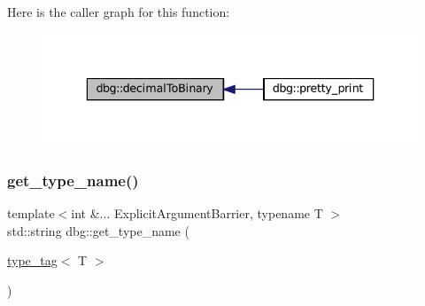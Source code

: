 Here is the caller graph for this function\+:
\nopagebreak
\begin{figure}[H]
\begin{center}
\leavevmode
\includegraphics[width=336pt]{namespacedbg_acbbd001b36aaa78716ea7d9d2aeb3e46_icgraph}
\end{center}
\end{figure}
\mbox{\label{namespacedbg_a20edc7ca4e92e4b3bddc6b983384aa00}} 
\subsubsection{\texorpdfstring{get\+\_\+type\+\_\+name()}{get\_type\_name()}\hspace{0.1cm}{\footnotesize\ttfamily [1/10]}}
{\footnotesize\ttfamily template$<$int \&... Explicit\+Argument\+Barrier, typename T $>$ \\
std\+::string dbg\+::get\+\_\+type\+\_\+name (\begin{DoxyParamCaption}\item[{\hyperlink{structdbg_1_1type__tag}{type\+\_\+tag}$<$ T $>$}]{ }\end{DoxyParamCaption})}

